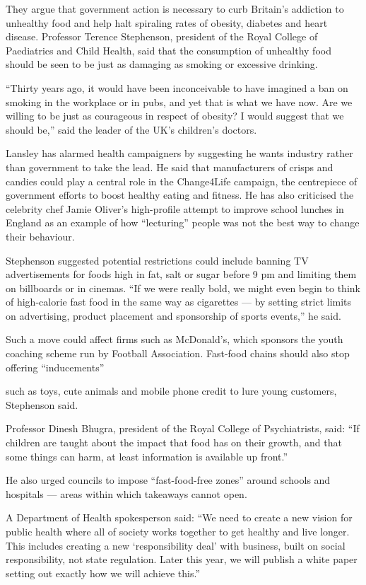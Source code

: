 \documentclass[UTF8,11pt]{ctexart}
\begin{document}
They argue that government action is necessary to curb Britain’s addiction to unhealthy food and help halt spiraling rates of obesity, diabetes and heart disease. Professor Terence Stephenson, president of the Royal College of Paediatrics and Child Health, said that the consumption of unhealthy food should be seen to be just as damaging as smoking or excessive drinking.


“Thirty years ago, it would have been inconceivable to have imagined a ban on smoking in the workplace or in pubs, and yet that is what we have now. Are we willing to be just as courageous in respect of obesity? I would suggest that we should be,” said the leader of the UK’s children’s doctors.


Lansley has alarmed health campaigners by suggesting he wants industry rather than government to take the lead. He said that manufacturers of crisps and candies could play a central role in the Change4Life campaign, the centrepiece of government efforts to boost healthy eating and fitness. He has also criticised the celebrity chef Jamie Oliver’s high-profile attempt to improve school lunches in England as an example of how “lecturing” people was not the best way to change their behaviour.


Stephenson suggested potential restrictions could include banning TV advertisements for foods high in fat, salt or sugar before 9 pm and limiting them on billboards or in cinemas. “If we were really bold, we might even begin to think of high-calorie fast food in the same way as cigarettes — by setting strict limits on advertising, product placement and sponsorship of sports events,” he said.


Such a move could affect firms such as McDonald’s, which sponsors the youth coaching scheme run by Football Association. Fast-food chains should also stop offering “inducements”


such as toys, cute animals and mobile phone credit to lure young customers, Stephenson said.


Professor Dinesh Bhugra, president of the Royal College of Psychiatrists, said: “If children are taught about the impact that food has on their growth, and that some things can harm, at least information is available up front.”


He also urged councils to impose “fast-food-free zones” around schools and hospitals — areas within which takeaways cannot open.


A Department of Health spokesperson said: “We need to create a new vision for public health where all of society works together to get healthy and live longer. This includes creating a new ‘responsibility deal’ with business, built on social responsibility, not state regulation. Later this year, we will publish a white paper setting out exactly how we will achieve this.”
\end{document}
